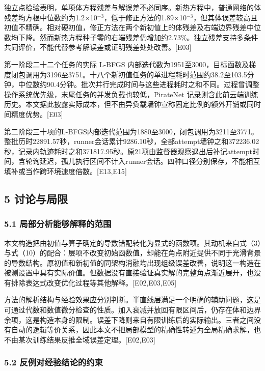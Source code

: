 \documentclass[11pt,a4paper]{article}
\begin{document}
独立点检验表明，单项体方程残差与解误差不必同序。新热方程中，普通网络的体残差均方根中位数约为1.2×10\ensuremath{^{-3}}，低于修正方法的1.89×10\ensuremath{^{-3}}，但其体误差较高且初值不精确。相对硬初值，修正方法在两个新初值上的体残差及右端边界残差中位数均下降。然而新热方程种子零的右端残差仍增加约2.73\%。独立残差支持多条件共同评价，不能代替参考解误差或证明残差处处改善。{[}E03{]}

第一阶段二十二个任务的实际 L-BFGS 内部迭代数为1951至3000，目标函数及梯度闭包调用为3196至3751。十八个新初值任务的单进程耗时范围约38.2至103.5分钟，中位数约90.4分钟。批次并行完成时间与这些进程耗时之和不同。过程曾调整操作系统优先级，末尾任务的并发负载也较低，PirateNet 记录则含此前云端训练历史。本文据此披露实际成本，但不由异负载墙钟宣称固定比例的额外开销或同时间精度优势。{[}E03{]}

第二阶段三十项的L-BFGS内部迭代范围为1880至3000，闭包调用为3211至3771。整批历时22891.57秒，runner会话累计9286.10秒，全部attempt墙钟之和372236.02秒，记录内轨迹耗时之和371817.95秒。原21项由监督器观察退出后补记attempt时间，含轮询延迟，孤儿执行区间不计入runner会话。四种口径分别保存，不能相互填补或当作跨环境速度倍数。{[}E13,E15{]}

\subsection{5 讨论与局限}\label{ux8ba8ux8bbaux4e0eux5c40ux9650}

\subsubsection{5.1 局部分析能够解释的范围}\label{ux5c40ux90e8ux5206ux6790ux80fdux591fux89e3ux91caux7684ux8303ux56f4}

本文构造把由初值与算子确定的导数错配转化为显式的函数项。其动机来自式（3）与式（10）的配合：层项不改变初始函数值，却能在角点附近提供不同于光滑背景的导数结构。原初值和新初值的同架构消融均出现组级误差改善，说明这一构造在被测设置中具有实际价值。但数据没有直接验证真实解的完整角点渐近展开，也没有排除表达式改变优化过程等其他解释。{[}E02,E03,E05{]}

方法的解析结构与经验效果应分别判断。半直线层满足一个明确的辅助问题，这是可通过代数和数值微分检查的性质。加入衰减并放回有限区间后，仍存在体和边界余项，这是构造本身的限制。误差下降则来自有限训练后的实际输出。三者之间没有自动的逻辑等价关系，因此本文不把局部模型的精确性转述为全局精确求解，也不由某次训练结果反推全域误差定理。{[}E02,E03{]}

\subsubsection{5.2 反例对经验结论的约束}\label{ux53cdux4f8bux5bf9ux7ecfux9a8cux7ed3ux8bbaux7684ux7ea6ux675f}
\end{document}
